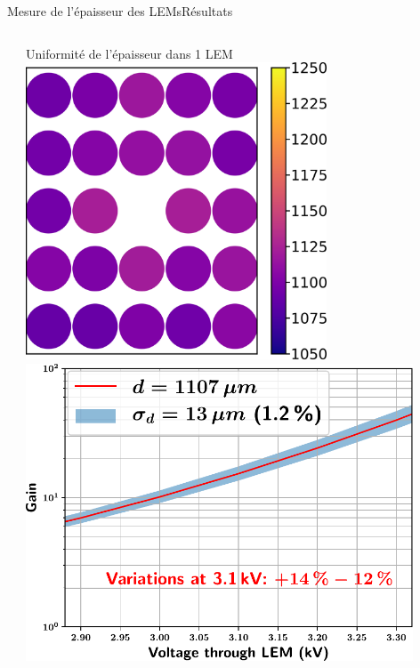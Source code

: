 \begin{frame}{Mesure de l'épaisseur des LEMs}{Résultats}
\begin{scriptsize}
\begin{columns}
\begin{column}{0.48\textwidth}
    			\end{column}
    			\hfill
    			\begin{column}{0.48\textwidth}
    				\centering
    				Uniformité de l'épaisseur dans 1 LEM\\
    				\centering
    				\includegraphics[width=0.7\textwidth]{./pictures/2D_LEM_thickness_distri.png}\\
    				\vspace{0.15cm}
    				\centering
    				\includegraphics[width=0.9\textwidth]{./pictures/measured_gain_fluctuations.pdf}
    			\end{column}
    		\end{columns}
    	\end{scriptsize}
    \end{frame}

